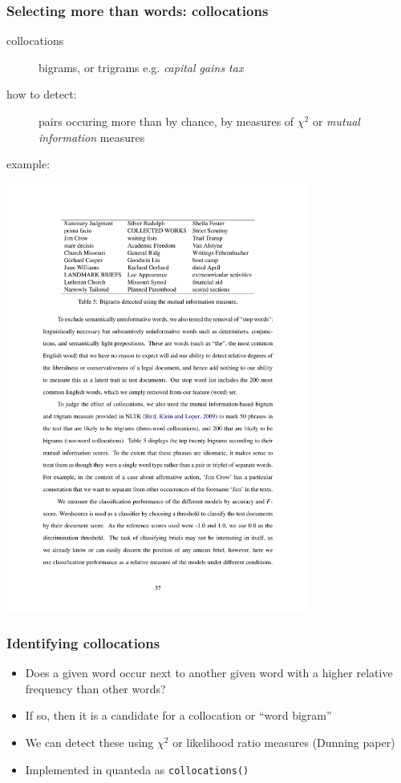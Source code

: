 \documentclass[11pt,handout]{beamer}
\begin{document}
\begin{frame}
 \frametitle{Selecting more than words: collocations}
 \begin{description}
  \item[collocations] \alert{bigrams}, or \alert{trigrams}
  e.g. \emph{capital gains tax}
  \item[how to detect:] pairs occuring more than by chance, by measures
  of $\chi^2$ or \emph{mutual information} measures
  \item[example:]
 \end{description}
 \includegraphics[width=10cm]{bigrams_amicus.pdf}
\end{frame}





\begin{frame}
 \frametitle{Identifying collocations}
 \begin{itemize}
  \item Does a given word occur next to another given word with a
        higher relative frequency than other words?
  \item If so, then it is a candidate for a collocation or ``word bigram''
  \item We can detect these using $\chi^2$ or likelihood ratio
        measures (Dunning paper)
  \item Implemented in quanteda as \texttt{collocations()}
 \end{itemize}
\end{frame}
\end{document}
